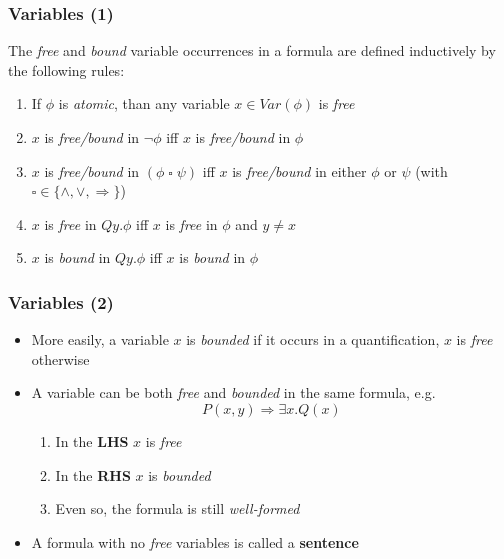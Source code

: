 \documentclass{beamer}
\begin{document}
                \begin{frame}
                    \frametitle{Variables (1)}
                    \begin{definition}
                        The \textit{free} and \textit{bound} variable occurrences in a formula are defined inductively by the following rules:
                        \begin{enumerate}
                            \item If $ \phi $ is \textit{atomic}, than any variable $ x \in Var(\phi) $ is \textit{free}
                            \item $ x $ is \textit{free/bound} in $ \neg \phi $ iff $ x $ is \textit{free/bound} in $ \phi $
                            \item $ x $ is \textit{free/bound} in $ (\phi\; \square\; \psi) $ iff $ x $ is \textit{free/bound} in either $ \phi $ or $ \psi $ (with $ \square \in \{ \wedge, \vee, \Rightarrow \} $)
                            \item $ x $ is \textit{free} in $ Qy.\phi $ iff $ x $ is \textit{free} in $ \phi $ and $ y \neq x $
                            \item $ x $ is \textit{bound} in $ Qy.\phi $ iff $ x $ is \textit{bound} in $ \phi $
                        \end{enumerate}
                    \end{definition}
                \end{frame}

                \begin{frame}
                    \frametitle{Variables (2)}
                    \begin{itemize}
                        \item More easily, a variable $ x $ is \textit{bounded} if it occurs in a quantification, $ x $ is \textit{free} otherwise
                        \item A variable can be both \textit{free} and \textit{bounded} in the same formula, e.g.
                        \[
                            P(x, y) \Rightarrow \exists x.Q(x)    
                        \]
                        \begin{enumerate}
                            \item In the \textbf{LHS} $ x $ is \textit{free}
                            \item In the \textbf{RHS} $ x $ is \textit{bounded}
                            \item Even so, the formula is still \textit{well-formed}
                        \end{enumerate}
                        \item A formula with no \textit{free} variables is called a \textbf{sentence}
                    \end{itemize}
                \end{frame}
\end{document}
